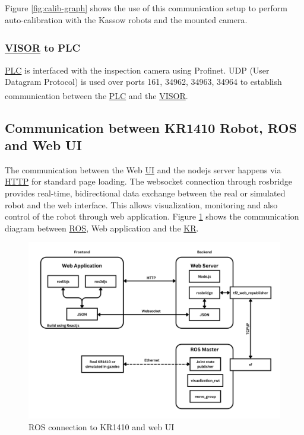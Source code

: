 Figure \ref{fig:calib-graph} shows the use of this communication setup to perform auto-calibration with the Kassow robots and the mounted camera.

\subsubsection{\hyperref[acro:VISOR]{VISOR}\textsuperscript{\textregistered} to PLC}
\hyperref[acro:PLC]{PLC} is interfaced with the inspection camera using Profinet.
UDP (User Datagram Protocol) is used over ports 161, 34962, 34963, 34964 to establish communication between the \hyperref[acro:PLC]{PLC} and the \hyperref[acro:VISOR]{VISOR}\textsuperscript{\textregistered}. \cite{visor_communication_manual}


\subsection{Communication between KR1410 Robot, ROS and Web UI}
\label{subsec:KR1410ROS}

The communication between the Web \hyperref[acro:UI]{UI} and the nodejs server happens via \hyperref[acro:HTTP]{HTTP} for standard page loading. The websocket connection through rosbridge provides real-time, bidirectional data exchange between the real or simulated robot and the web interface. This allows visualization, monitoring
and also control of the robot through web application. Figure \ref{fig:ros-web-graph} shows the communication diagram between \hyperref[acro:ROS]{ROS}, Web application and the \hyperref[acro:KR]{KR}.

\begin{figure}[h]
  \centering
  \includegraphics[width=1\textwidth]{figures/ros-web-graph.png}
  \caption{ROS connection to KR1410 and web UI}
  \label{fig:ros-web-graph}
\end{figure}

